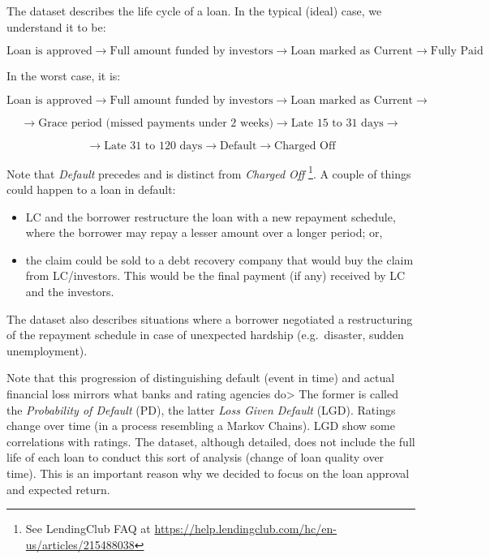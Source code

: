 \documentclass[11pt,]{report}
\newenvironment{Shaded}{\begin{snugshade}}{\end{snugshade}}
\newcommand{\NormalTok}[1]{#1}
\let\rmarkdownfootnote\footnote%
\def\footnote{\protect\rmarkdownfootnote}
\begin{document}
\begin{Shaded}
\end{Shaded}

The dataset describes the life cycle of a loan. In the typical (ideal) case, we understand it to be:

\[ 
\text{Loan is approved}  \rightarrow  \text{Full amount funded by investors} \rightarrow \text{Loan marked as Current} \rightarrow \text{Fully Paid}
\]

In the worst case, it is:

\[ 
\text{Loan is approved}  \rightarrow  \text{Full amount funded by investors} \rightarrow \text{Loan marked as Current} \rightarrow 
\]

\[
\rightarrow \text{Grace period (missed payments under 2 weeks)} \rightarrow \text{Late 15 to 31 days} \rightarrow
\]

\[
\rightarrow  \text{Late 31 to 120 days} \rightarrow  \text{Default} \rightarrow  \text{Charged Off}
\]

Note that \emph{Default} precedes and is distinct from \emph{Charged Off} \footnote{See LendingClub FAQ at \url{https://help.lendingclub.com/hc/en-us/articles/215488038}}. A couple of things could happen to a loan in default:

\begin{itemize}
\item
  LC and the borrower restructure the loan with a new repayment schedule, where the borrower may repay a lesser amount over a longer period; or,
\item
  the claim could be sold to a debt recovery company that would buy the claim from LC/investors. This would be the final payment (if any) received by LC and the investors.
\end{itemize}

The dataset also describes situations where a borrower negotiated a restructuring of the repayment schedule in case of unexpected hardship (e.g.~disaster, sudden unemployment).

Note that this progression of distinguishing default (event in time) and actual financial loss mirrors what banks and rating agencies do\textgreater{} The former is called the \emph{Probability of Default} (PD), the latter \emph{Loss Given Default} (LGD). Ratings change over time (in a process resembling a Markov Chains). LGD show some correlations with ratings. The dataset, although detailed, does not include the full life of each loan to conduct this sort of analysis (change of loan quality over time). This is an important reason why we decided to focus on the loan approval and expected return.
\end{document}
